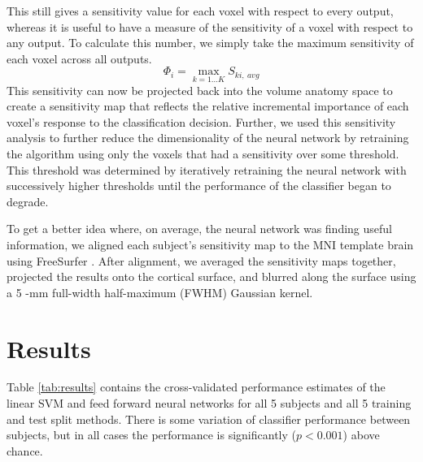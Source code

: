 \documentclass[preprint,5p,authoryear]{elsarticle}
\begin{document}
This still gives a sensitivity value for each voxel with respect to every output, whereas it is useful to have a measure of the sensitivity of a voxel with respect to any output.
To calculate this number, we simply take the maximum sensitivity of each voxel across all outputs.
\begin{equation}
\Phi_{i} = \max_{k=1 \dots K}{S_{ki,~avg}}
\end{equation}
This sensitivity can now be projected back into the volume anatomy space to create a sensitivity map that reflects the relative incremental importance of each voxel's response to the classification decision.
Further, we used this sensitivity analysis to further reduce the dimensionality of the neural network by retraining the algorithm using only the voxels that had a sensitivity over some threshold.
This threshold was determined by iteratively retraining the neural network with successively higher thresholds until the performance of the classifier began to degrade.

To get a better idea where, on average, the neural network was finding useful information, we aligned each subject's sensitivity map to the MNI template brain \citep{MNItemplate} using FreeSurfer \citep{FreeSurfer}.
After alignment, we averaged the sensitivity maps together, projected the results onto the cortical surface, and blurred along the surface using a 5 -mm full-width half-maximum (FWHM) Gaussian kernel.

\section{Results}
Table \ref{tab:results} contains the cross-validated performance estimates of the linear SVM and feed forward neural networks for all 5 subjects and all 5 training and test split methods.
There is some variation of classifier performance between subjects, but in all cases the performance is significantly ($p < 0.001$) above chance. 
\end{document}
